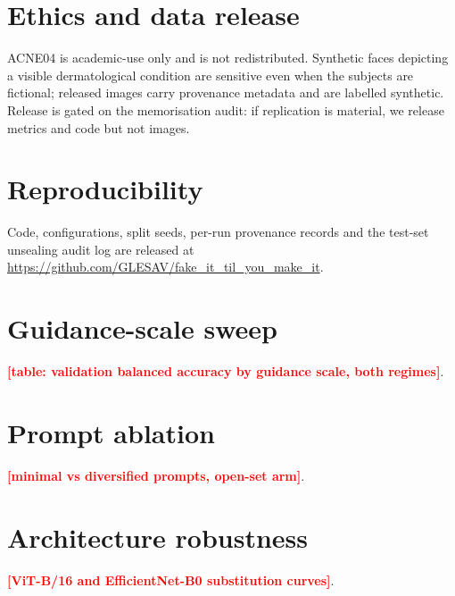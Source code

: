 \documentclass[11pt]{article}
\newcommand{\RESULT}[1]{\textcolor{red}{\textbf{[#1]}}}
\begin{document}
\section*{Ethics and data release}
ACNE04 is academic-use only and is not redistributed. Synthetic faces depicting a
visible dermatological condition are sensitive even when the subjects are fictional;
released images carry provenance metadata and are labelled synthetic. Release is
gated on the memorisation audit: if replication is material, we release metrics and
code but not images.

\section*{Reproducibility}
Code, configurations, split seeds, per-run provenance records and the test-set
unsealing audit log are released at \url{https://github.com/GLESAV/fake_it_til_you_make_it}.




\appendix
\section{Guidance-scale sweep}
\RESULT{table: validation balanced accuracy by guidance scale, both regimes}.

\section{Prompt ablation}
\RESULT{minimal vs diversified prompts, open-set arm}.

\section{Architecture robustness}
\RESULT{ViT-B/16 and EfficientNet-B0 substitution curves}.
\end{document}
